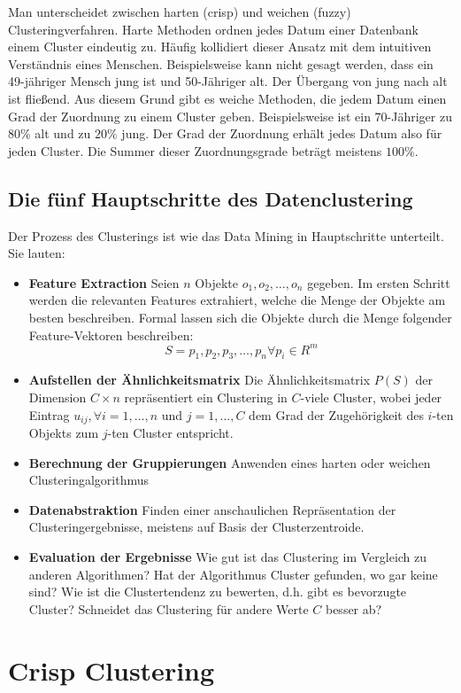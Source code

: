 \documentclass[11pt,ceqn]{book}
\begin{document}
Man unterscheidet zwischen harten (crisp) und weichen (fuzzy) Clusteringverfahren. Harte Methoden ordnen jedes Datum einer Datenbank einem Cluster eindeutig zu. Häufig kollidiert dieser Ansatz mit dem intuitiven Verständnis eines Menschen. Beispielsweise kann nicht gesagt werden, dass ein 49-jähriger Mensch jung ist und 50-Jähriger alt. Der Übergang von jung nach alt ist fließend. Aus diesem Grund gibt es weiche Methoden, die jedem Datum einen Grad der Zuordnung zu einem Cluster geben. Beispielsweise ist ein 70-Jähriger zu $80\%$ alt und zu $20\%$ jung. Der Grad der Zuordnung erhält jedes Datum also für jeden Cluster. Die Summer dieser Zuordnungsgrade beträgt meistens $100\%$.
\\
\subsection{Die fünf Hauptschritte des Datenclustering}
Der Prozess des Clusterings ist wie das Data Mining in Hauptschritte unterteilt\cite{csteps}. Sie lauten:
\begin{itemize}
\item \textbf{Feature Extraction} Seien $n$ Objekte ${o_1, o_2, \dots, o_n}$ gegeben. Im ersten Schritt werden die relevanten Features extrahiert, welche die Menge der Objekte am besten beschreiben. Formal lassen sich die Objekte durch die Menge folgender Feature-Vektoren beschreiben: $$S =  p_1, p_2, p_3, \dots, p_n  \forall p_i \in R^m$$
\item \textbf{Aufstellen der Ähnlichkeitsmatrix} Die Ähnlichkeitsmatrix $P(S)$ der Dimension $C \times n$ repräsentiert ein Clustering in $C$-viele Cluster, wobei jeder Eintrag $u_{ij}, \forall i=1, \dots, n$ und $j=1, \dots, C$ dem Grad der Zugehörigkeit des $i$-ten Objekts zum $j$-ten Cluster entspricht.
\item \textbf{Berechnung der Gruppierungen} Anwenden eines harten oder weichen Clusteringalgorithmus
\item \textbf{Datenabstraktion} Finden einer anschaulichen Repräsentation der Clusteringergebnisse, meistens auf Basis der Clusterzentroide.
\item \textbf{Evaluation der Ergebnisse} Wie gut ist das Clustering im Vergleich zu anderen Algorithmen? Hat der Algorithmus Cluster gefunden, wo gar keine sind? Wie ist die Clustertendenz zu bewerten, d.h. gibt es bevorzugte Cluster? Schneidet das Clustering für andere Werte $C$  besser ab?
\end{itemize}

\section{Crisp Clustering}
\end{document}
